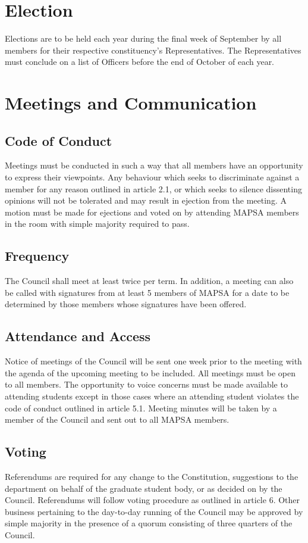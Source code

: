 \documentclass[11pt]{article}
\begin{document}
	\section{Election}
	Elections are to be held each year during the final week of September by all members for their respective constituency's Representatives. The Representatives must conclude on a list of Officers before the end of October of each year.
	
	\section{Meetings and Communication}
	\subsection{Code of Conduct}
	Meetings must be conducted in such a way that all members have an opportunity to express their viewpoints. Any behaviour which seeks to discriminate against a member for any reason outlined in article 2.1, or which seeks to silence dissenting opinions will not be tolerated and may result in ejection from the meeting. A motion must be made for ejections and voted on by attending MAPSA members in the room with simple majority required to pass.
	
	\subsection{Frequency}
	The Council shall meet at least twice per term. In addition, a meeting can also be called with signatures from at least 5 members of MAPSA for a date to be determined by those members whose signatures have been offered.
	
	\subsection{Attendance and Access}
	Notice of meetings of the Council will be sent one week prior to the meeting with the agenda of the upcoming meeting to be included. All meetings must be open to all members. The opportunity to voice concerns must be made available to attending students except in those cases where an attending student violates the code of conduct outlined in article 5.1. Meeting minutes will be taken by a member of the Council and sent out to all MAPSA members.
	
	\subsection{Voting}
	Referendums are required for any change to the Constitution, suggestions to the department on behalf of the graduate student body, or as decided on by the Council. Referendums will follow voting procedure as outlined in article 6. Other business pertaining to the day-to-day running of the Council may be approved by simple majority in the presence of a quorum consisting of three quarters of the Council.
	
\end{document}
